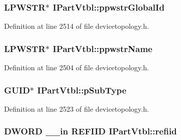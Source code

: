 \subsubsection[{\texorpdfstring{ppwstr\+Global\+Id}{ppwstrGlobalId}}]{ {\bf L\+P\+W\+S\+TR}$\ast$ I\+Part\+Vtbl\+::ppwstr\+Global\+Id}\hypertarget{struct_i_part_vtbl_a5b45a4424297e276388afef83c381a4f}{}\label{struct_i_part_vtbl_a5b45a4424297e276388afef83c381a4f}


Definition at line 2514 of file devicetopology.\+h.

\subsubsection[{\texorpdfstring{ppwstr\+Name}{ppwstrName}}]{ {\bf L\+P\+W\+S\+TR}$\ast$ I\+Part\+Vtbl\+::ppwstr\+Name}\hypertarget{struct_i_part_vtbl_a734a223870e602d69566eb3a6c6e8459}{}\label{struct_i_part_vtbl_a734a223870e602d69566eb3a6c6e8459}


Definition at line 2504 of file devicetopology.\+h.

\subsubsection[{\texorpdfstring{p\+Sub\+Type}{pSubType}}]{\setlength{\rightskip}{0pt plus 5cm}G\+U\+ID$\ast$ I\+Part\+Vtbl\+::p\+Sub\+Type}\hypertarget{struct_i_part_vtbl_a50e0f46d9dfabe779979bfb323bd5278}{}\label{struct_i_part_vtbl_a50e0f46d9dfabe779979bfb323bd5278}


Definition at line 2523 of file devicetopology.\+h.

\subsubsection[{\texorpdfstring{refiid}{refiid}}]{ {\bf D\+W\+O\+RD} {\bf \+\_\+\+\_\+in} {\bf R\+E\+F\+I\+ID} I\+Part\+Vtbl\+::refiid}\hypertarget{struct_i_part_vtbl_a67aaf835dc111c2d0d73b49f5ac3fd82}{}\label{struct_i_part_vtbl_a67aaf835dc111c2d0d73b49f5ac3fd82}


